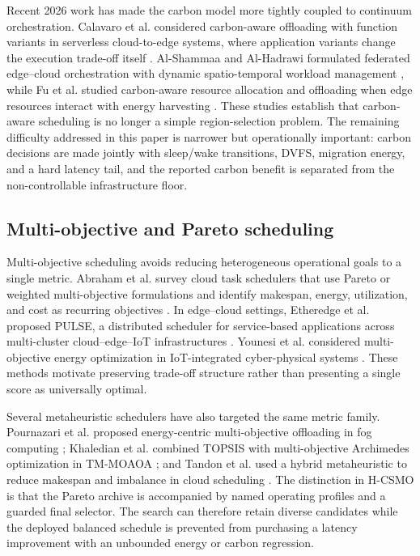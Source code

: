 \documentclass[preprint,12pt]{elsarticle}
\newcommand{\method}{H-CSMO\xspace}
\begin{document}
Recent 2026 work has made the carbon model more tightly coupled to continuum orchestration. Calavaro et al. considered carbon-aware offloading with function variants in serverless cloud-to-edge systems, where application variants change the execution trade-off itself \cite{calavaro2026functionvariants}. Al-Shammaa and Al-Hadrawi formulated federated edge--cloud orchestration with dynamic spatio-temporal workload management \cite{alshammaa2026federated}, while Fu et al. studied carbon-aware resource allocation and offloading when edge resources interact with energy harvesting \cite{fu2026ehcarbon}. These studies establish that carbon-aware scheduling is no longer a simple region-selection problem. The remaining difficulty addressed in this paper is narrower but operationally important: carbon decisions are made jointly with sleep/wake transitions, DVFS, migration energy, and a hard latency tail, and the reported carbon benefit is separated from the non-controllable infrastructure floor.

\subsection{Multi-objective and Pareto scheduling}

Multi-objective scheduling avoids reducing heterogeneous operational goals to a single metric. Abraham et al. survey cloud task schedulers that use Pareto or weighted multi-objective formulations and identify makespan, energy, utilization, and cost as recurring objectives \cite{abraham2025multi}. In edge--cloud settings, Etheredge et al. proposed PULSE, a distributed scheduler for service-based applications across multi-cluster cloud--edge--IoT infrastructures \cite{Etheredge2026Pulse}. Younesi et al. considered multi-objective energy optimization in IoT-integrated cyber-physical systems \cite{younesi2025moticps}. These methods motivate preserving trade-off structure rather than presenting a single score as universally optimal.

Several metaheuristic schedulers have also targeted the same metric family. Pournazari et al. proposed energy-centric multi-objective offloading in fog computing \cite{pournazari2025multi}; Khaledian et al. combined TOPSIS with multi-objective Archimedes optimization in TM-MOAOA \cite{khaledian2025tm}; and Tandon et al. used a hybrid metaheuristic to reduce makespan and imbalance in cloud scheduling \cite{tandon2025novel}. The distinction in \method is that the Pareto archive is accompanied by named operating profiles and a guarded final selector. The search can therefore retain diverse candidates while the deployed balanced schedule is prevented from purchasing a latency improvement with an unbounded energy or carbon regression.
\end{document}
